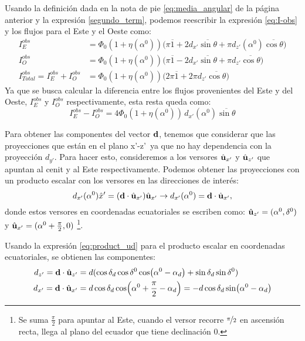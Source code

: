      Usando la definición dada en la nota de pie \ref{eq:media_angular} de la página anterior y la expresión \ref{segundo_term}, podemos reescribir la expresión \ref{eq:I-obs} y los flujos para el Este y el Oeste como:
    \begin{align*}
    I^{obs}_E&= \Phi_0 (1+ \eta(\alpha^0)) \Big( \pi\overline{1} + 2d_{x'}\overline{\sin\theta} + \pi d_{z'}(\alpha^0)\overline{\cos\theta}  \Big) \\
        I^{obs}_O&= \Phi_0 (1+ \eta(\alpha^0)) \Big( \pi \overline{1} - 2d_{x'}\overline{\sin\theta}   + \pi d_{z'}\overline{\cos\theta} \Big) \\
        I_{Total}^{obs}=I^{obs}_E +I^{obs}_O &= \Phi_0 (1+ \eta(\alpha^0)) \Big( 2\pi\overline{1} +2\pi d_{z'}\overline{\cos\theta}  \Big)
    \end{align*}
    Ya que se busca calcular la diferencia entre los flujos provenientes del Este y del Oeste, $I^{obs}_E $ y $  I^{obs}_O $ respectivamente, esta resta queda como:
    \begin{equation*}
        I^{obs}_E -  I^{obs}_O = 4 \Phi_0 (1+ \eta(\alpha^0)) \,  d_{x'}(\alpha^0)\overline{\sin\theta}
    \end{equation*}

    Para obtener las componentes del vector $\bf{d}$, tenemos que considerar que las proyecciones que están en el plano x'-z'\,  ya que no hay dependencia con la proyección $d_{y'}$. Para hacer esto, consideremos a los versores $\hat{\bf{u}}_{x'}$ y $\hat{\bf{u}}_{z'}$ que apuntan al cenit y al Este respectivamente. Podemos obtener las proyecciones con un producto escalar con los versores en las direcciones de interés:
    \begin{equation}
        d_{x'}(\alpha^0) \hat{x}' =  (\textbf{d}\cdot\hat{\bf{u}}_{x'})\hat{\bf{u}}_{x'} \rightarrow d_{x'}(\alpha^0) = \textbf{d}\cdot\hat{\bf{u}}_{x'},
    \end{equation}
    donde estos versores en coordenadas ecuatoriales se escriben como:
    $\hat{\bf{u}}_{z'}= (\alpha^0,\delta^0 )$ y $ \hat{\bf{u}}_{x'} = (\alpha^0 + \frac{\pi}{2},0)$ \footnote{Se suma  $\frac{\pi}{2}$ para apuntar al Este, cuando el versor recorre $\nicefrac{\pi}{2}$ en ascensión recta, llega al plano del ecuador que tiene declinación $0$.}.

    Usando la expresión \ref{eq:product_ud} para el producto escalar en coordenadas ecuatoriales, se obtienen las componentes:
    \begin{align}
        d_{z'}=\textbf{d}\cdot\hat{\bf{u}}_{z'} &= d (\cos\delta_d \cos\delta^0 \cos(\alpha^0 - \alpha_d) + \sin\delta_d  \sin\delta^0)\\
        d_{x'}=\textbf{d}\cdot\hat{\bf{u}}_{x'} &= d \cos\delta_d \cos(\alpha^0 +\frac{\pi}{2} - \alpha_d) 
        = -d\cos\delta_d \sin(\alpha^0  - \alpha_d) \label{eq:total_flux_eta}
    \end{align}
    
